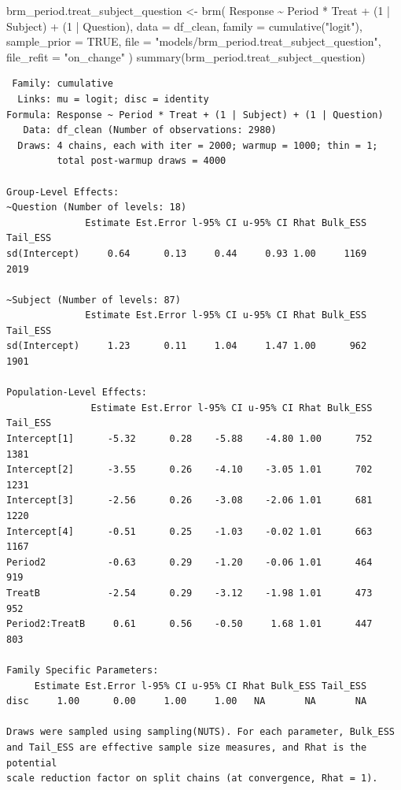 \documentclass[
  12pt,
  a4paper,
  extrafontsizes,
  onecolumn,
  openright]{memoir}
\newenvironment{Shaded}{\begin{snugshade}}{\end{snugshade}}
\newcommand{\AttributeTok}[1]{\textcolor[rgb]{0.40,0.45,0.13}{#1}}
\newcommand{\ConstantTok}[1]{\textcolor[rgb]{0.56,0.35,0.01}{#1}}
\newcommand{\DecValTok}[1]{\textcolor[rgb]{0.68,0.00,0.00}{#1}}
\newcommand{\FunctionTok}[1]{\textcolor[rgb]{0.28,0.35,0.67}{#1}}
\newcommand{\NormalTok}[1]{\textcolor[rgb]{0.00,0.23,0.31}{#1}}
\newcommand{\OtherTok}[1]{\textcolor[rgb]{0.00,0.23,0.31}{#1}}
\newcommand{\SpecialCharTok}[1]{\textcolor[rgb]{0.37,0.37,0.37}{#1}}
\newcommand{\StringTok}[1]{\textcolor[rgb]{0.13,0.47,0.30}{#1}}
\begin{document}
\begin{Shaded}
\begin{Highlighting}[]
\NormalTok{brm\_period.treat\_subject\_question }\OtherTok{\textless{}{-}} \FunctionTok{brm}\NormalTok{(}
\NormalTok{    Response }\SpecialCharTok{\textasciitilde{}}\NormalTok{ Period }\SpecialCharTok{*}\NormalTok{ Treat }\SpecialCharTok{+}\NormalTok{ (}\DecValTok{1} \SpecialCharTok{|}\NormalTok{ Subject) }\SpecialCharTok{+}\NormalTok{ (}\DecValTok{1} \SpecialCharTok{|}\NormalTok{ Question),}
    \AttributeTok{data =}\NormalTok{ df\_clean,}
    \AttributeTok{family =} \FunctionTok{cumulative}\NormalTok{(}\StringTok{"logit"}\NormalTok{),}
    \AttributeTok{sample\_prior =} \ConstantTok{TRUE}\NormalTok{,}
    \AttributeTok{file =} \StringTok{"models/brm\_period.treat\_subject\_question"}\NormalTok{,}
    \AttributeTok{file\_refit =} \StringTok{"on\_change"}
\NormalTok{)}
\FunctionTok{summary}\NormalTok{(brm\_period.treat\_subject\_question)}
\end{Highlighting}
\end{Shaded}

\begin{verbatim}
 Family: cumulative 
  Links: mu = logit; disc = identity 
Formula: Response ~ Period * Treat + (1 | Subject) + (1 | Question) 
   Data: df_clean (Number of observations: 2980) 
  Draws: 4 chains, each with iter = 2000; warmup = 1000; thin = 1;
         total post-warmup draws = 4000

Group-Level Effects: 
~Question (Number of levels: 18) 
              Estimate Est.Error l-95% CI u-95% CI Rhat Bulk_ESS Tail_ESS
sd(Intercept)     0.64      0.13     0.44     0.93 1.00     1169     2019

~Subject (Number of levels: 87) 
              Estimate Est.Error l-95% CI u-95% CI Rhat Bulk_ESS Tail_ESS
sd(Intercept)     1.23      0.11     1.04     1.47 1.00      962     1901

Population-Level Effects: 
               Estimate Est.Error l-95% CI u-95% CI Rhat Bulk_ESS Tail_ESS
Intercept[1]      -5.32      0.28    -5.88    -4.80 1.00      752     1381
Intercept[2]      -3.55      0.26    -4.10    -3.05 1.01      702     1231
Intercept[3]      -2.56      0.26    -3.08    -2.06 1.01      681     1220
Intercept[4]      -0.51      0.25    -1.03    -0.02 1.01      663     1167
Period2           -0.63      0.29    -1.20    -0.06 1.01      464      919
TreatB            -2.54      0.29    -3.12    -1.98 1.01      473      952
Period2:TreatB     0.61      0.56    -0.50     1.68 1.01      447      803

Family Specific Parameters: 
     Estimate Est.Error l-95% CI u-95% CI Rhat Bulk_ESS Tail_ESS
disc     1.00      0.00     1.00     1.00   NA       NA       NA

Draws were sampled using sampling(NUTS). For each parameter, Bulk_ESS
and Tail_ESS are effective sample size measures, and Rhat is the potential
scale reduction factor on split chains (at convergence, Rhat = 1).
\end{verbatim}
\end{document}
